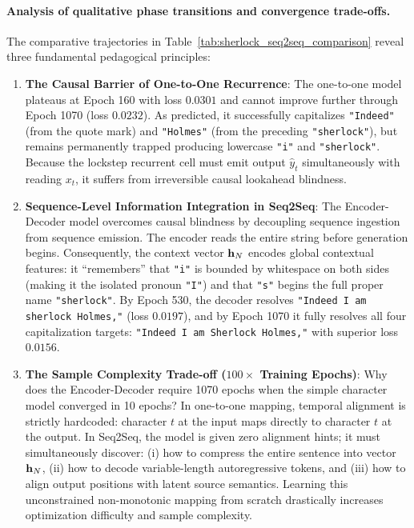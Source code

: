 \documentclass[../../main.tex]{subfiles}
\begin{document}
\paragraph{Analysis of qualitative phase transitions and convergence trade-offs.}
The comparative trajectories in Table~\ref{tab:sherlock_seq2seq_comparison} reveal three fundamental pedagogical principles:
\begin{enumerate}
    \item \textbf{The Causal Barrier of One-to-One Recurrence}: The one-to-one model plateaus at Epoch 160 with loss $0.0301$ and cannot improve further through Epoch 1070 (loss $0.0232$). As predicted, it successfully capitalizes \texttt{"Indeed"} (from the quote mark) and \texttt{"Holmes"} (from the preceding \texttt{"sherlock"}), but remains permanently trapped producing lowercase \texttt{"i"} and \texttt{"sherlock"}. Because the lockstep recurrent cell must emit output $\hat{y}_t$ simultaneously with reading $x_t$, it suffers from irreversible causal lookahead blindness.
    \item \textbf{Sequence-Level Information Integration in Seq2Seq}: The Encoder-Decoder model overcomes causal blindness by decoupling sequence ingestion from sequence emission. The encoder reads the entire string before generation begins. Consequently, the context vector $\mathbf{h}_N$ encodes global contextual features: it ``remembers'' that \texttt{"i"} is bounded by whitespace on both sides (making it the isolated pronoun \texttt{"I"}) and that \texttt{"s"} begins the full proper name \texttt{"sherlock"}. By Epoch 530, the decoder resolves \texttt{"Indeed I am sherlock Holmes,"} (loss $0.0197$), and by Epoch 1070 it fully resolves all four capitalization targets: \texttt{"Indeed I am Sherlock Holmes,"} with superior loss $0.0156$.
    \item \textbf{The Sample Complexity Trade-off ($100\times$ Training Epochs)}: Why does the Encoder-Decoder require 1070 epochs when the simple character model converged in 10 epochs? In one-to-one mapping, temporal alignment is strictly hardcoded: character $t$ at the input maps directly to character $t$ at the output. In Seq2Seq, the model is given zero alignment hints; it must simultaneously discover: (i) how to compress the entire sentence into vector $\mathbf{h}_N$, (ii) how to decode variable-length autoregressive tokens, and (iii) how to align output positions with latent source semantics. Learning this unconstrained non-monotonic mapping from scratch drastically increases optimization difficulty and sample complexity.
\end{enumerate}
\end{document}
